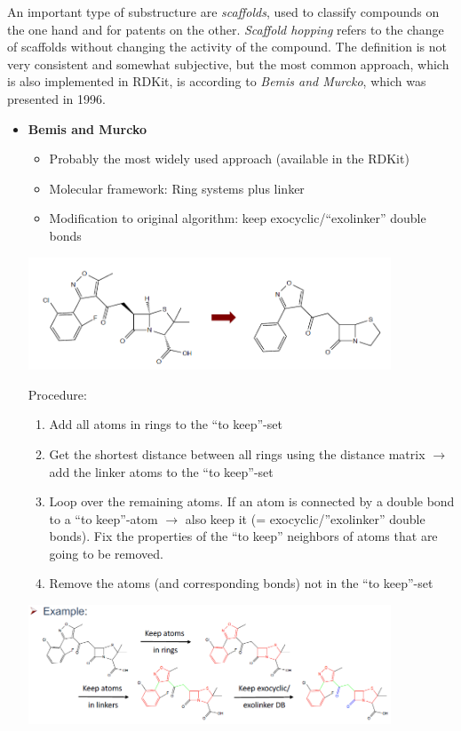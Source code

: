 An important type of substructure are \emph{scaffolds}, used to classify compounds on the one hand and for patents on the other. \emph{Scaffold hopping} refers to the change of scaffolds without changing the activity of the compound. The definition is not very consistent and somewhat subjective, but the most common approach, which is also implemented in RDKit, is according to \emph{Bemis and Murcko}, which was presented in 1996. 

\begin{itemize}
    \item \textbf{Bemis and Murcko}
    \begin{itemize}
        \item Probably the most widely used approach (available in the RDKit)
        \item Molecular framework: Ring systems plus linker
        \item Modification to original algorithm: keep exocyclic/“exolinker” double bonds
    \end{itemize}
    \begin{center}\includegraphics[width=0.85\textwidth]{img/cheminformatics/McsScaffoldsBemis.png}\end{center}
    Procedure:
    \begin{enumerate}
        \item Add all atoms in rings to the “to keep”-set
        \item Get the shortest distance between all rings using the distance matrix $\rightarrow$ add the linker atoms to the “to keep”-set
        \item Loop over the remaining atoms. If an atom is connected by a double bond to a “to keep”-atom $\rightarrow$ also keep it (= exocyclic/”exolinker” double bonds). Fix the properties of the “to keep” neighbors of atoms that are going to be removed.
        \item Remove the atoms (and corresponding bonds) not in the “to keep”-set
    \end{enumerate}
    \begin{center}\includegraphics[width=0.85\textwidth]{img/cheminformatics/McsScaffoldsProcedure.png}\end{center}

\end{itemize}

